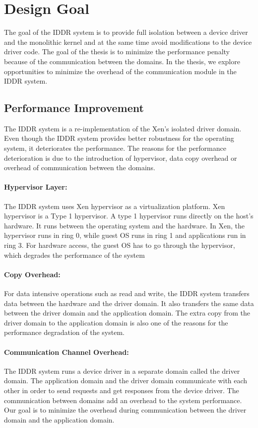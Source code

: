 \section{Design Goal}\label{sec:goals}
The goal of the IDDR system is to provide full isolation between a device driver and the monolithic kernel and at the same time avoid modifications to the device driver code. The goal of the thesis is to minimize the performance penalty because of the communication between the domains. In the thesis, we explore opportunities to minimize the overhead of the communication module in the IDDR system.

\subsection*{Performance Improvement}
The IDDR system is a re-implementation of the Xen's isolated driver domain. Even though the IDDR system provides better robustness for the operating system, it deteriorates the performance. The reasons for the performance deterioration is due to the introduction of hypervisor, data copy overhead or overhead of communication between the domains. 

\paragraph{Hypervisor Layer: } The IDDR system uses Xen hypervisor as a virtualization platform. Xen hypervisor is a Type 1 hypervisor. A type 1 hypervisor runs directly on the host's hardware. It runs between the operating system and the hardware. In Xen, the hypervisor runs in ring 0, while guest OS runs in ring 1 and applications run in ring 3. For hardware access, the guest OS has to go through the hypervisor, which degrades the performance of the system

\paragraph{Copy Overhead: } For data intensive operations such as read and write, the IDDR system transfers data between the hardware and the driver domain. It also transfers the same data between the driver domain and the application domain. The extra copy from the driver domain to the application domain is also one of the reasons for the performance degradation of the system. 

\paragraph{Communication Channel Overhead: } The IDDR system runs a device driver in a separate domain called the driver domain. The application domain and the driver domain communicate with each other in order to send requests and get responses from the device driver. The communication between domains add an overhead to the system performance. Our goal is to minimize the overhead during communication between the driver domain and the application domain.

